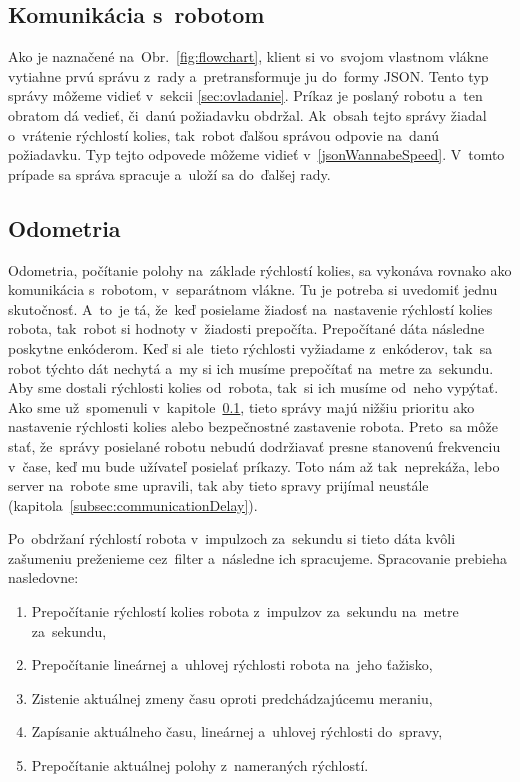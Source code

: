 \subsection{Komunikácia s~robotom}
\label{sec:robotComms}

Ako je naznačené na~Obr.~\ref{fig:flowchart}, klient si vo~svojom vlastnom vlákne vytiahne
prvú správu z~rady a~pretransformuje ju do~formy JSON. Tento typ správy môžeme vidieť v~sekcii
\ref{sec:ovladanie}. Príkaz je poslaný robotu a~ten obratom dá vedieť, či~danú požiadavku obdržal.
Ak~obsah tejto správy žiadal o~vrátenie rýchlostí kolies, tak~robot ďalšou správou odpovie
na~danú požiadavku. Typ tejto odpovede môžeme vidieť v~\ref{jsonWannabeSpeed}. V~tomto prípade
sa správa spracuje a~uloží sa do~ďalšej rady.

\subsection{Odometria}
\label{sec:odometria}

Odometria, počítanie polohy na~základe rýchlostí kolies, sa vykonáva rovnako ako komunikácia
s~robotom, v~separátnom vlákne. Tu je potreba si uvedomiť jednu skutočnosť. A~to~je tá, že~keď
posielame žiadosť na~nastavenie rýchlostí kolies robota, tak~robot si hodnoty v~žiadosti prepočíta.
Prepočítané dáta následne poskytne enkóderom. Keď si ale~tieto rýchlosti vyžiadame z~enkóderov,
tak~sa robot týchto dát nechytá a~my si ich musíme prepočítať na~metre za~sekundu. Aby sme dostali
rýchlosti kolies od~robota, tak~si ich musíme od~neho vypýtať. Ako sme už~spomenuli v~kapitole~\ref{sec:robotComms},
tieto správy majú nižšiu prioritu ako nastavenie rýchlosti kolies alebo bezpečnostné zastavenie
robota. Preto~sa môže stať, že~správy posielané robotu nebudú dodržiavať presne stanovenú frekvenciu
v~čase, keď mu bude užívateľ posielať príkazy. Toto nám až tak~neprekáža, lebo server na~robote sme upravili, tak aby tieto
spravy prijímal neustále (kapitola~\ref{subsec:communicationDelay}).

Po~obdržaní rýchlostí robota v~impulzoch za~sekundu si tieto dáta kvôli zašumeniu preženieme cez~filter
a~následne ich spracujeme. Spracovanie prebieha nasledovne:

\begin{enumerate}
	\item Prepočítanie rýchlostí kolies robota z~impulzov za~sekundu na~metre za~sekundu,
	\item Prepočítanie lineárnej a~uhlovej rýchlosti robota na~jeho ťažisko,
	\item Zistenie aktuálnej zmeny času oproti predchádzajúcemu meraniu,
	\item Zapísanie aktuálneho času, lineárnej a~uhlovej rýchlosti do~spravy,
	\item Prepočítanie aktuálnej polohy z~nameraných rýchlostí.
\end{enumerate}

